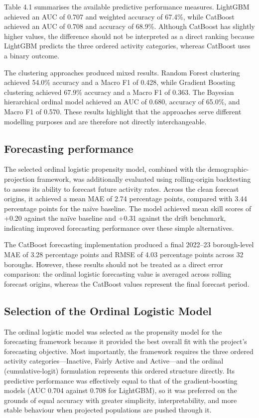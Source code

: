 \documentclass[ %
                    author={Ashrey Ashrey, Sanya Kapoor, Trisha Sharma, Yash Bhooshan Pandloskar},
                supervisor={Dr. Dalila O’Grady},
                    degree={MSc},
                     title={Using machine learning to forecast physical activity participation, volunteering and activity patterns in London},
                  subtitle={},
                      type={},
                      year={2021}]{dissertation}
\begin{document}
\noindent
Table 4.1 summarises the available predictive performance measures. LightGBM achieved an AUC of 0.707 and weighted accuracy of 67.4\%, while CatBoost achieved an AUC of 0.708 and accuracy of 68.9\%. Although CatBoost has slightly higher values, the difference should not be interpreted as a direct ranking because LightGBM predicts the three ordered activity categories, whereas CatBoost uses a binary outcome.

The clustering approaches produced mixed results. Random Forest clustering achieved 54.0\% accuracy and a Macro F1 of 0.428, while Gradient Boosting clustering achieved 67.9\% accuracy and a Macro F1 of 0.363. The Bayesian hierarchical ordinal model achieved an AUC of 0.680, accuracy of 65.0\%, and Macro F1 of 0.570. These results highlight that the approaches serve different modelling purposes and are therefore not directly interchangeable.

\FloatBarrier
\subsection{Forecasting performance}

\noindent
The selected ordinal logistic propensity model, combined with the demographic-projection framework, was additionally evaluated using rolling-origin backtesting to assess its ability to forecast future activity rates. Across the clean forecast origins, it achieved a mean MAE of 2.74 percentage points, compared with 3.44 percentage points for the naïve baseline. The model achieved mean skill scores of +0.20 against the naïve baseline and +0.31 against the drift benchmark, indicating improved forecasting performance over these simple alternatives.

The CatBoost forecasting implementation produced a final 2022--23 borough-level MAE of 3.28 percentage points and RMSE of 4.03 percentage points across 32 boroughs. However, these results should not be treated as a direct error comparison: the ordinal logistic forecasting value is averaged across rolling forecast origins, whereas the CatBoost values represent the final forecast period.

\FloatBarrier
\subsection{Selection of the Ordinal Logistic Model}

\noindent
The ordinal logistic model was selected as the propensity model for the forecasting framework because it provided the best overall fit with the project's forecasting objective. Most importantly, the framework requires the three ordered activity categories---Inactive, Fairly Active and Active---and the ordinal (cumulative-logit) formulation represents this ordered structure directly. Its predictive performance was effectively equal to that of the gradient-boosting models (AUC 0.704 against 0.708 for LightGBM), so it was preferred on the grounds of equal accuracy with greater simplicity, interpretability, and more stable behaviour when projected populations are pushed through it.
\end{document}
